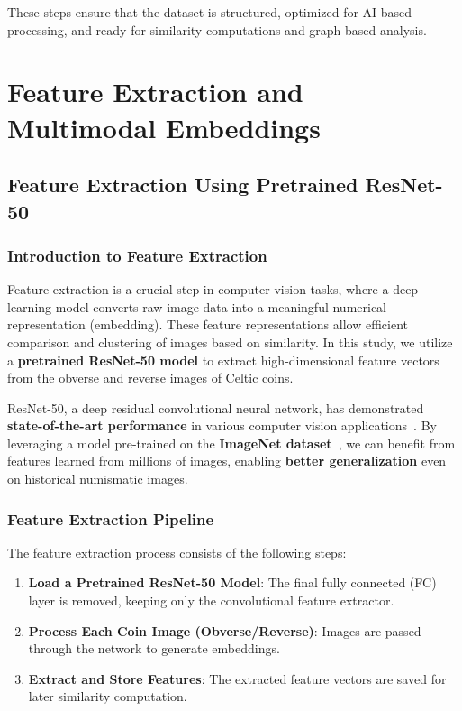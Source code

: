 \documentclass[nolibertine, english, algorithm, nomencl, minted]{ttlab-qualify}
\begin{document}
These steps ensure that the dataset is structured, optimized for AI-based processing, 
and ready for similarity computations and graph-based analysis.

\chapter{Feature Extraction and Multimodal Embeddings}

\section{Feature Extraction Using Pretrained ResNet-50}

\subsection{Introduction to Feature Extraction}
Feature extraction is a crucial step in computer vision tasks, where a deep learning model converts raw image 
data into a meaningful numerical representation (embedding). These feature representations allow efficient comparison 
and clustering of images based on similarity. In this study, we utilize a \textbf{pretrained ResNet-50 model} to extract 
high-dimensional feature vectors from the obverse and reverse images of Celtic coins.

ResNet-50, a deep residual convolutional neural network, has demonstrated \textbf{state-of-the-art performance} in various 
computer vision applications~\parencite{he2016resnet}. 
By leveraging a model pre-trained on the \textbf{ImageNet dataset}~\parencite{deng2009imagenet}, 
we can benefit from features learned from millions of images, enabling \textbf{better generalization} 
even on historical numismatic images.

\subsection{Feature Extraction Pipeline}
The feature extraction process consists of the following steps:
\begin{enumerate}
    \item \textbf{Load a Pretrained ResNet-50 Model}: The final fully connected (FC) layer is removed, keeping only the convolutional feature extractor.
    \item \textbf{Process Each Coin Image (Obverse/Reverse)}: Images are passed through the network to generate embeddings.
    \item \textbf{Extract and Store Features}: The extracted feature vectors are saved for later similarity computation.
\end{enumerate}
\end{document}
